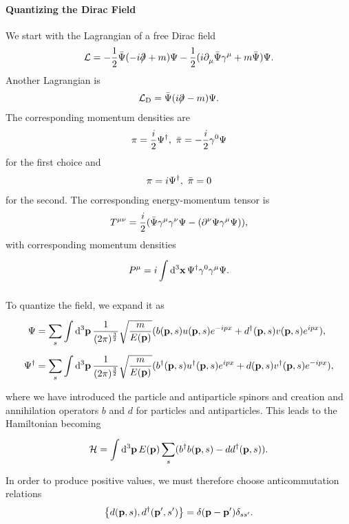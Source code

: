 \paragraph{Quantizing the Dirac Field}
We start with the Lagrangian of a free Dirac field
\begin{align*}
	\mathcal{L} = -\frac{1}{2}\bar{\Psi}(-i\slashed{\partial^{}_{}{}} + m)\Psi - \frac{1}{2}(i\partial^{}_{\mu}{\bar{\Psi}}\gamma^{\mu} + m\bar{\Psi})\Psi.
\end{align*}
Another Lagrangian is
\begin{align*}
	\mathcal{L}_{\text{D}} = \bar{\Psi}(i\slashed{\partial^{}_{}{}} - m)\Psi.
\end{align*}
The corresponding momentum densities are
\begin{align*}
	\pi = \frac{i}{2}\Psi^{\dagger},\ \bar{\pi} = -\frac{i}{2}\gamma^{0}\Psi
\end{align*}
for the first choice and
\begin{align*}
	\pi = i\Psi^{\dagger},\ \bar{\pi} = 0
\end{align*}
for the second. The corresponding energy-momentum tensor is
\begin{align*}
	T^{\mu\nu} = \frac{i}{2}(\bar{\Psi}\gamma^{\mu}\gamma^{\nu}\Psi - (\partial^{\nu}_{}{\Psi}\gamma^{\mu}\Psi)),
\end{align*}
with corresponding momentum densities
\begin{align*}
	P^{\mu} = i\int\limits_{}^{}\dd[3]{\vb{x}}\Psi^{\dagger}\gamma^{0}\gamma^{\mu}\Psi.
\end{align*}

To quantize the field, we expand it as
\begin{align*}
	\Psi     &= \sum\limits_{s}\int\limits_{}^{}\dd[3]{\vb{p}}\frac{1}{(2\pi)^{\frac{3}{2}}}\sqrt{\frac{m}{E(\vb{p})}}(b(\vb{p}, s)u(\vb{p}, s)e^{-ipx} + d^{\dagger}(\vb{p}, s)v(\vb{p}, s)e^{ipx}), \\
	\Psi^{\dagger} &= \sum\limits_{s}\int\limits_{}^{}\dd[3]{\vb{p}}\frac{1}{(2\pi)^{\frac{3}{2}}}\sqrt{\frac{m}{E(\vb{p})}}(b^{\dagger}(\vb{p}, s)u^{\dagger}(\vb{p}, s)e^{ipx} + d(\vb{p}, s)v^{\dagger}(\vb{p}, s)e^{-ipx}),
\end{align*}
where we have introduced the particle and antiparticle spinors and creation and annihilation operators $b$ and $d$ for particles and antiparticles. This leads to the Hamiltonian becoming
\begin{align*}
	\mathcal{H} = \int\limits_{}^{}\dd[3]{\vb{p}}E(\vb{p})\sum\limits_{s}(b^{\dagger} b(\vb{p}, s) - dd^{\dagger}(\vb{p}, s)).
\end{align*}
In order to produce positive values, we must therefore choose anticommutation relations
\begin{align*}
	\acomm{d(\vb{p}, s)}{d\adj(\vb{p}\p, s\p)} = \delta(\vb{p} - \vb{p}\p)\delta_{ss\p}.
\end{align*}

